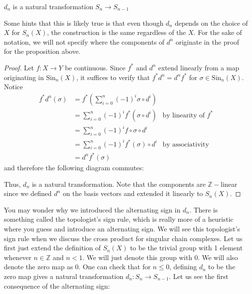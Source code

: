 \documentclass[12pt,reqno]{amsart}
\numberwithin{theorem}{section}
\theoremstyle{definition}
\theoremstyle{remark}
\numberwithin{equation}{section}
\newcommand{\Z}{\mathbb Z}
\theoremstyle{definition}
\newcommand{\Sin}{\mathrm{Sin}}
\begin{document}
\begin{proposition}
    $d_n$ is a natural transformation $S_n \rightarrow S_{n-1}$
\end{proposition} 
Some hints that this is likely true is that even though $d_n$ depends on the choice of $X$ for $S_n(X)$, the construction is the same regardless of the $X$. For the sake of notation, we will not specify where the components of $d^n$ originate in the proof for the proposition above.
\begin{proof}
    Let $f:X\rightarrow Y$ be continuous. Since $f^*$ and $d^n$ extend linearly from a map originating in $\Sin_n(X)$, it suffices to verify that $f^*d^n=d^nf^*$ for $\sigma \in \Sin_n(X)$. Notice
    \begin{align*}
        f^*d^n(\sigma) &= f^*\left ( \displaystyle \sum_{i=0}^n (-1)^{i}\sigma \circ d^i\right ) \\
        &=\displaystyle \sum_{i=0}^n (-1)^{i}f^*(\sigma \circ d^i) & \text{by linearity of }f^* \\
        &= \displaystyle \sum_{i=0}^n (-1)^{i}f\circ \sigma \circ d^i \\
        &= \displaystyle \sum_{i=0}^n (-1)^{i}f^*( \sigma) \circ d^i & \text{by associativity} \\
        &= d^nf^*(\sigma)
    \end{align*}
    and therefore the following diagram commutes:
    \begin{center}
    \end{center}
    Thus, $d_n$ is a natural transformation. Note that the components are $\Z-$linear since we defined $d^n$ on the basis vectors and extended it linearly to $S_n(X)$.
\end{proof}
You may wonder why we introduced the alternating sign in $d_n$. There is something called the topologist's sign rule, which is really more of a heuristic where you guess and introduce an alternating sign. We will see this topologist's sign rule when we discuss the cross product for singular chain complexes. Let us first just extend the definition of $S_n(X)$ to be the trivial group with 1 element whenever $n \in \Z$ and $n<1$. We will just denote this group with $0$. We will also denote the zero map as $0$. One can check that for $n \leq 0$, defining $d_n$ to be the zero map gives a natural transformation $d_n:S_{n}\rightarrow S_{n-1}$. Let us see the first consequence of the alternating sign:
\end{document}
